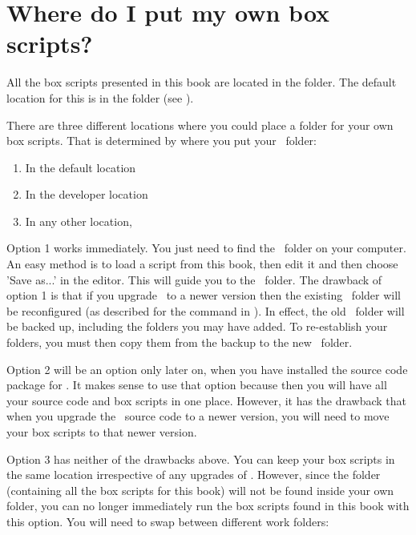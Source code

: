 \section{Where do I put my own box scripts?}
\label{ch:where-box-scripts}
All the box scripts presented in this book are located in the  folder. The default location for this is in the  folder (see ).

There are three different locations where you could place a folder for your own box scripts. That is determined by where you put your \ushome\ folder:
\begin{enumerate}
\item In the default location \ushome
\item In the developer location \devhomefolderexplained
\item In any other location, \eg\ 
\end{enumerate}

Option 1 works immediately. You just need to find the \ushome\ folder on your computer. An easy method is to load a script from this book, then edit it and then choose 'Save as...' in the editor. This will guide you to the \ushome\ folder. The drawback of option 1 is that if you upgrade \US\ to a newer version then the existing \ushome\ folder will be reconfigured (as described for the  command in ). In effect, the old \ushome\ folder will be backed up, including the folders you may have added. To re-establish your folders, you must then copy them from the backup to the new \ushome\ folder.

Option 2 will be an option only later on, when you have installed the source code package for \US. It makes sense to use that option because then you will have all your source code and box scripts in one place. However, it has the drawback that when you upgrade the \US\ source code to a newer version, you will need to move your box scripts to that newer version.

Option 3 has neither of the drawbacks above. You can keep your box scripts in the same location irrespective of any upgrades of \US. However, since the  folder (containing all the box scripts for this book) will not be found inside your own folder, you can no longer immediately run the box scripts found in this book with this option. You will need to swap between different work folders:

